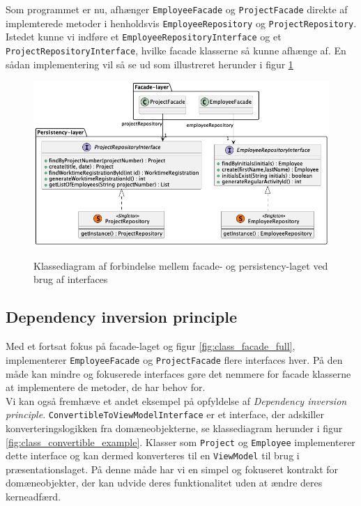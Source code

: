 Som programmet er nu, afhænger \texttt{EmployeeFacade} og \texttt{ProjectFacade} direkte af implemterede metoder i henholdsvis \texttt{EmployeeRepository} og \texttt{ProjectRepository}. Istedet kunne vi indføre et \texttt{EmployeeRepositoryInterface} og et \texttt{ProjectRepositoryInterface}, hvilke facade klasserne så kunne afhænge af. En sådan implementering vil så se ud som illustreret herunder i figur \ref{fig:class_facade_persistency_improved}
\begin{figure}[H]
    \centering
    \caption{Klassediagram af forbindelse mellem facade- og persistency-laget ved brug af interfaces}
    \includegraphics[width = 12cm, keepaspectratio]{TaskFusion/out/assets/diagrams/class_persistency_to_facade_improved/persistency_to_facade_example.png}
    \label{fig:class_facade_persistency_improved}
\end{figure}

\subsection{Dependency inversion principle} \label{sec:solid_d}
Med et fortsat fokus på facade-laget og figur \ref{fig:class_facade_full}, implementerer \texttt{EmployeeFacade} og \texttt{ProjectFacade} flere interfaces hver. På den måde kan mindre og fokuserede interfaces gøre det nemmere for facade klasserne at implementere de metoder, de har behov for.
\\
Vi kan også fremhæve et andet eksempel på opfyldelse af \textit{Dependency inversion principle}. \texttt{ConvertibleToViewModelInterface} er et interface, der adskiller konverteringslogikken fra domæneobjekterne, se klassediagram herunder i figur \ref{fig:class_convertible_example}. Klasser som \texttt{Project} og \texttt{Employee} implementerer dette interface og kan dermed konverteres til en \texttt{ViewModel} til brug i præsentationslaget. På denne måde har vi en simpel og fokuseret kontrakt for domæneobjekter, der kan udvide deres funktionalitet uden at ændre deres kerneadfærd. 

